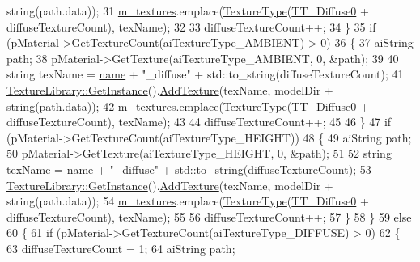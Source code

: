 \begin{DoxyCode}
{      string}(path.data));
31       \hyperlink{class_material_a4a3c5bccb33c08f476f890aaecdef3d8}{m\_textures}.emplace(\hyperlink{_material_8h_a65468556d79304b3a4bfc464cc12e549}{TextureType}(\hyperlink{_material_8h_a65468556d79304b3a4bfc464cc12e549a930f237c6d8e17be231333de7101cd87}{TT\_Diffuse0} + diffuseTextureCount), 
      texName);
32 
33       diffuseTextureCount++;
34     \}
35     \textcolor{keywordflow}{if} (pMaterial->GetTextureCount(aiTextureType\_AMBIENT) > 0)
36     \{
37       aiString path;
38       pMaterial->GetTexture(aiTextureType\_AMBIENT, 0, &path);
39 
40       \textcolor{keywordtype}{string} texName = \hyperlink{class_material_a988570645fdd4363ca975f5bb4e47205}{name} + \textcolor{stringliteral}{"\_diffuse"} + std::to\_string(diffuseTextureCount);
41       \hyperlink{class_singleton_a74f32751d99bf3cc95fe17aba11f4b07}{TextureLibrary::GetInstance}().\hyperlink{class_texture_library_a16501654a4ee4179f37cc2a6d21381ff}{AddTexture}(texName, modelDir + \textcolor{keywordtype}{
      string}(path.data));
42       \hyperlink{class_material_a4a3c5bccb33c08f476f890aaecdef3d8}{m\_textures}.emplace(\hyperlink{_material_8h_a65468556d79304b3a4bfc464cc12e549}{TextureType}(\hyperlink{_material_8h_a65468556d79304b3a4bfc464cc12e549a930f237c6d8e17be231333de7101cd87}{TT\_Diffuse0} + diffuseTextureCount), 
      texName);
43 
44       diffuseTextureCount++;
45 
46     \}
47     \textcolor{keywordflow}{if} (pMaterial->GetTextureCount(aiTextureType\_HEIGHT))
48     \{
49       aiString path;
50       pMaterial->GetTexture(aiTextureType\_HEIGHT, 0, &path);
51 
52       \textcolor{keywordtype}{string} texName = \hyperlink{class_material_a988570645fdd4363ca975f5bb4e47205}{name} + \textcolor{stringliteral}{"\_diffuse"} + std::to\_string(diffuseTextureCount);
53       \hyperlink{class_singleton_a74f32751d99bf3cc95fe17aba11f4b07}{TextureLibrary::GetInstance}().\hyperlink{class_texture_library_a16501654a4ee4179f37cc2a6d21381ff}{AddTexture}(texName, modelDir + \textcolor{keywordtype}{
      string}(path.data));
54       \hyperlink{class_material_a4a3c5bccb33c08f476f890aaecdef3d8}{m\_textures}.emplace(\hyperlink{_material_8h_a65468556d79304b3a4bfc464cc12e549}{TextureType}(\hyperlink{_material_8h_a65468556d79304b3a4bfc464cc12e549a930f237c6d8e17be231333de7101cd87}{TT\_Diffuse0} + diffuseTextureCount), 
      texName);
55 
56       diffuseTextureCount++;
57     \}
58   \}
59   \textcolor{keywordflow}{else}
60   \{
61     \textcolor{keywordflow}{if} (pMaterial->GetTextureCount(aiTextureType\_DIFFUSE) > 0)
62     \{
63       diffuseTextureCount = 1;
64       aiString path;

\end{DoxyCode}
